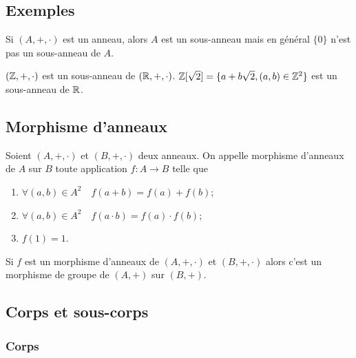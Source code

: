 \subsection{Exemples}

Si $(A,+,\cdot)$ est un anneau, alors $A$ est un sous-anneau mais en général $\{0\}$ n'est pas un sous-anneau de $A$.

$(\mathbb{Z},+,\cdot)$ est un sous-anneau de $(\mathbb{R},+,\cdot)$. $\mathbb{Z}[\sqrt{2}]=\{a+b\sqrt{2}, (a,b) \in \mathbb{Z}^2\}$ est un sous-anneau de $\mathbb{R}$.

\subsection{Morphisme d'anneaux}

\begin{defdef}
  Soient $(A,+,\cdot)$ et $(B,+,\cdot)$ deux anneaux. On appelle morphisme d'anneaux de $A$ sur $B$ toute application $f:A \longrightarrow B$ telle que
  \begin{enumerate}
  \item $\forall (a,b) \in A^2 \quad f(a+b)=f(a)+f(b)$;
  \item $\forall (a,b )\in A^2 \quad f(a \cdot b)=f(a) \cdot f(b)$;
  \item $f(1)=1$.
  \end{enumerate}
\end{defdef}

Si $f$ est un morphisme d'anneaux de $(A,+,\cdot)$ et $(B,+,\cdot)$ alors c'est un morphisme de groupe de $(A,+)$ sur $(B,+)$.

\subsection{Corps et sous-corps}

\subsubsection{Corps}

